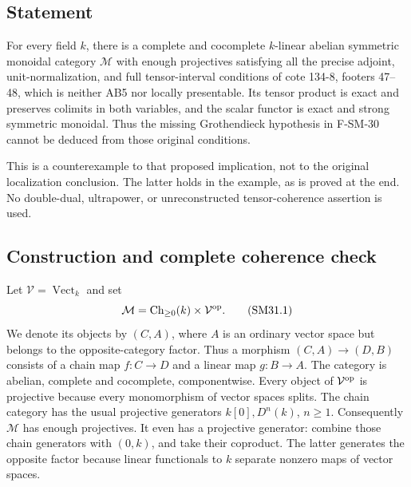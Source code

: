 \documentclass[11pt,a4paper]{article}
\theoremstyle{definition}\newtheorem{definition}[theorem]{Definition}
\theoremstyle{remark}\newtheorem{remark}[theorem]{Remark}
\begin{document}
\subsection{Statement}
For every field \(k\), there is a complete and cocomplete
\(k\)-linear abelian symmetric monoidal category \(\mathcal M\)
with enough projectives satisfying all the precise adjoint,
unit-normalization, and full tensor-interval conditions of
cote 134-8, footers 47--48, which is neither AB5 nor locally
presentable.  Its tensor product is exact and preserves colimits
in both variables,
and the scalar functor is exact and strong symmetric monoidal.
Thus the missing Grothendieck hypothesis in F-SM-30 cannot be
deduced from those original conditions.

This is a counterexample to that proposed implication, not to
the original localization conclusion.  The latter holds in the
example, as is proved at the end.  No double-dual, ultrapower,
or unreconstructed tensor-coherence assertion is used.

\subsection{Construction and complete coherence check}
Let \(\mathcal V=\operatorname{Vect}_k\) and set
\[
 \mathcal M=\operatorname{Ch}_{\ge0}(k)\times\mathcal V^{\rm op}.
                                                               \tag{SM31.1}
\]
We denote its objects by \((C,A)\), where \(A\) is an ordinary
vector space but belongs to the opposite-category factor.
Thus a morphism \((C,A)\to(D,B)\) consists of a chain map
\(f:C\to D\) and a linear map \(g:B\to A\).
The category is abelian, complete and cocomplete, componentwise.
Every object of \(\mathcal V^{\rm op}\) is projective because
every monomorphism of vector spaces splits.  The chain category
has the usual projective generators \(k[0],D^n(k)\), \(n\ge1\).
Consequently \(\mathcal M\) has enough projectives.
It even has a projective generator: combine those chain
generators with \((0,k)\), and take their coproduct.
The latter generates the opposite factor because linear
functionals to \(k\) separate nonzero maps of vector spaces.
\end{document}
